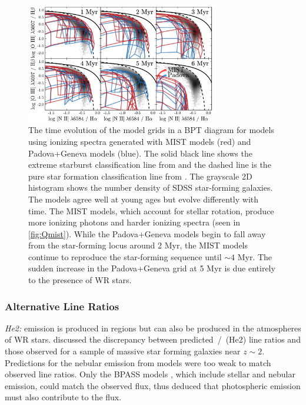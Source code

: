 \begin{figure}[!htbp]
  \begin{centering}
    \includegraphics[width=0.75\textwidth]{manuscript/chapter2/f24.pdf}
    \caption{The time evolution of the model grids in a BPT diagram for models using ionizing spectra generated with MIST models (red) and Padova+Geneva models (blue). The solid black line shows the extreme starburst classification line from \citet{Kewley01} and the dashed line is the pure star formation classification line from \citet{Kauffmann03a}. The  grayscale 2D histogram shows the number density of SDSS star-forming galaxies. The models agree well at young ages but evolve differently with time. The MIST models, which account for stellar rotation, produce more ionizing photons and harder ionizing spectra (seen in \ref{fig:Qmist}). While the Padova+Geneva models begin to fall away from the star-forming locus around 2 Myr, the MIST models continue to reproduce the star-forming sequence until ${\sim}4$ Myr. The sudden increase in the Padova+Geneva grid at 5 Myr is due entirely to the presence of WR stars.}
    \label{fig:BPTmistAge}
  \end{centering}
\end{figure}

\subsubsection{Alternative Line Ratios}

{\it He2:} \heii emission is produced in \hii regions but can also be produced in the atmospheres of WR stars. \citet{Steidel16} discussed the discrepancy between predicted \heii{}\,/\,\hb{} (He2) line ratios and those observed for a sample of massive star forming galaxies near $z\sim2$. Predictions for the nebular \heii{} emission from \SB{} models were too weak to match observed \heii{} line ratios. Only the BPASS models \citep{Eldridge12}, which include stellar and nebular \heii{} emission, could match the observed \heii{} flux, thus \citet{Steidel16} deduced that photospheric emission must also contribute to the \heii flux. 

